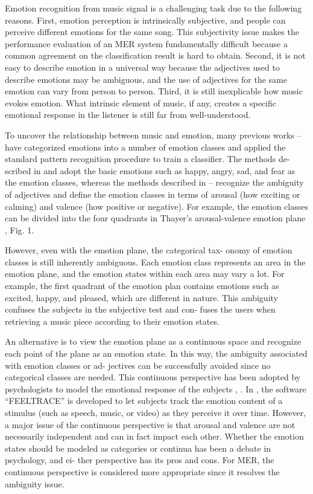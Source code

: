 \documentclass[journal, twoside]{IEEEtran}
\begin{document}
Emotion recognition from music signal is a challenging task
due to the following reasons. First, emotion perception is intrinsically subjective, and people can perceive different emotions for the same song. This subjectivity issue makes the performance evaluation of an MER system fundamentally difficult because a common agreement on the classification result is hard to
obtain. Second, it is not easy to describe emotion in a universal
way because the adjectives used to describe emotions may be
ambiguous, and the use of adjectives for the same emotion can
vary from person to person. Third, it is still inexplicable how
music evokes emotion. What intrinsic element of music, if any,
creates a specific emotional response in the listener is still far
from well-understood.

To uncover the relationship between music and emotion,
many previous works \cite{1}--\cite{8} have categorized emotions into
a number of emotion classes and applied the standard pattern
recognition procedure to train a classifier. The methods de-
scribed in \cite{1} and \cite{2} adopt the basic emotions such as happy,
angry, sad, and fear as the emotion classes, whereas the methods
described in \cite{3}--\cite{8} recognize the ambiguity of adjectives and
define the emotion classes in terms of arousal (how exciting or
calming) and valence (how positive or negative). For example,
the emotion classes can be divided into the four quadrants in
Thayer’s arousal-valence emotion plane \cite{12}, Fig. 1.

However, even with the emotion plane, the categorical tax-
onomy of emotion classes is still inherently ambiguous. Each
emotion class represents an area in the emotion plane, and the
emotion states within each area may vary a lot. For example,
the first quadrant of the emotion plan contains emotions such as
excited, happy, and pleased, which are different in nature. This
ambiguity confuses the subjects in the subjective test and con-
fuses the users when retrieving a music piece according to their
emotion states.%



\IEEEpubidadjcol
An alternative is to view the emotion plane as a continuous
space and recognize each point of the plane as an emotion state.
In this way, the ambiguity associated with emotion classes or ad-
jectives can be successfully avoided since no categorical classes
are needed. This continuous perspective has been adopted by
psychologists to model the emotional response of the subjects
\cite{13}, \cite{14}. In \cite{15}, the software “FEELTRACE” is developed
to let subjects track the emotion content of a stimulus (such as
speech, music, or video) as they perceive it over time. However,
a major issue of the continuous perspective is that arousal and
valence are not necessarily independent and can in fact impact
each other. Whether the emotion states should be modeled as
categories or continua has been a debate in psychology, and ei-
ther perspective has its pros and cons. For MER, the continuous
perspective is considered more appropriate since it resolves the
ambiguity issue.
\IEEEpubidadjcol
\end{document}
